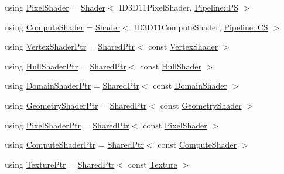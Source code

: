 \begin{DoxyCompactItemize}
\item 
using \mbox{\hyperlink{namespacemage_1_1rendering_a19905114913398d5073148f6c416e1b7}{Pixel\+Shader}} = \mbox{\hyperlink{classmage_1_1rendering_1_1_shader}{Shader}}$<$ I\+D3\+D11\+Pixel\+Shader, \mbox{\hyperlink{structmage_1_1rendering_1_1_pipeline_1_1_p_s}{Pipeline\+::\+PS}} $>$
\item 
using \mbox{\hyperlink{namespacemage_1_1rendering_aa67e55ba4dca44d39b0367b31f091863}{Compute\+Shader}} = \mbox{\hyperlink{classmage_1_1rendering_1_1_shader}{Shader}}$<$ I\+D3\+D11\+Compute\+Shader, \mbox{\hyperlink{structmage_1_1rendering_1_1_pipeline_1_1_c_s}{Pipeline\+::\+CS}} $>$
\item 
using \mbox{\hyperlink{namespacemage_1_1rendering_aaf704b9c54a4181f4950a1761de69dda}{Vertex\+Shader\+Ptr}} = \mbox{\hyperlink{namespacemage_a1e01ae66713838a7a67d30e44c67703e}{Shared\+Ptr}}$<$ const \mbox{\hyperlink{classmage_1_1rendering_1_1_vertex_shader}{Vertex\+Shader}} $>$
\item 
using \mbox{\hyperlink{namespacemage_1_1rendering_a6f33b2e1ea7f2ae3824dc7fb6875c655}{Hull\+Shader\+Ptr}} = \mbox{\hyperlink{namespacemage_a1e01ae66713838a7a67d30e44c67703e}{Shared\+Ptr}}$<$ const \mbox{\hyperlink{namespacemage_1_1rendering_aa133f36cd1a81c87eedf962270a12f48}{Hull\+Shader}} $>$
\item 
using \mbox{\hyperlink{namespacemage_1_1rendering_a85a8911c7c1e9e42bd7c3acbc2725076}{Domain\+Shader\+Ptr}} = \mbox{\hyperlink{namespacemage_a1e01ae66713838a7a67d30e44c67703e}{Shared\+Ptr}}$<$ const \mbox{\hyperlink{namespacemage_1_1rendering_a02bd57ea68f48dd6e0d37a1362ad1ea2}{Domain\+Shader}} $>$
\item 
using \mbox{\hyperlink{namespacemage_1_1rendering_aa5d63f80f9483d0896718813768ba1cf}{Geometry\+Shader\+Ptr}} = \mbox{\hyperlink{namespacemage_a1e01ae66713838a7a67d30e44c67703e}{Shared\+Ptr}}$<$ const \mbox{\hyperlink{namespacemage_1_1rendering_accaa3591de8a0d7a2c72c1dcc0cf9592}{Geometry\+Shader}} $>$
\item 
using \mbox{\hyperlink{namespacemage_1_1rendering_af03d922b228ee9c8542baaa2ecc9f259}{Pixel\+Shader\+Ptr}} = \mbox{\hyperlink{namespacemage_a1e01ae66713838a7a67d30e44c67703e}{Shared\+Ptr}}$<$ const \mbox{\hyperlink{namespacemage_1_1rendering_a19905114913398d5073148f6c416e1b7}{Pixel\+Shader}} $>$
\item 
using \mbox{\hyperlink{namespacemage_1_1rendering_ab3dc9f2114f2e9255b91d9c051da52ea}{Compute\+Shader\+Ptr}} = \mbox{\hyperlink{namespacemage_a1e01ae66713838a7a67d30e44c67703e}{Shared\+Ptr}}$<$ const \mbox{\hyperlink{namespacemage_1_1rendering_aa67e55ba4dca44d39b0367b31f091863}{Compute\+Shader}} $>$
\item 
using \mbox{\hyperlink{namespacemage_1_1rendering_a6f3ae54f825328465b0cdde0f0de4a36}{Texture\+Ptr}} = \mbox{\hyperlink{namespacemage_a1e01ae66713838a7a67d30e44c67703e}{Shared\+Ptr}}$<$ const \mbox{\hyperlink{classmage_1_1rendering_1_1_texture}{Texture}} $>$
\end{DoxyCompactItemize}
